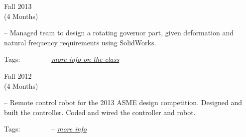 
\flushleft \begin{minipage}[t]{\dateColWidth}
Fall 2013 \\
(4 Months)
\end{minipage}
\begin{minipage}[t]{0.8\textwidth}
	--
	Managed team to design a rotating governor part, given deformation and natural frequency requirements using SolidWorks. 
	
	Tags:
	 \vline\ 
	 \vline\
	 \vline\
	 \vline\
	--
	\href{http://claytonketner.com/cad-at-a-glance/}{\uline{\textit{more info on the class}}}
\end{minipage}

\divLine

%

\flushleft \begin{minipage}[t]{\dateColWidth}
Fall 2012 \\
(4 Months)
\end{minipage}
\begin{minipage}[t]{0.8\textwidth}
	--
	Remote control robot for the 2013 ASME design competition. Designed and built the controller. Coded and wired the controller and robot.

	Tags:
	 \vline\ 
	 \vline\ 
	 \vline\ 
	 \vline\ 
	 \vline\ 
	--
	\href{http://www.claytonketner.com/senior-project-robot/}{\uline{\textit{more info}}}
\end{minipage}

